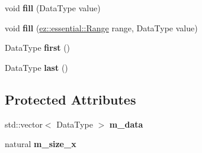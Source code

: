 \begin{DoxyCompactItemize}
\item 
\mbox{\label{classez_1_1maths_1_1Vector_af15ef4c65e880324592dd48622c3e664}} 
void {\bfseries fill} (Data\+Type value)
\item 
\mbox{\label{classez_1_1maths_1_1Vector_a3140d8b5e6aec1ac16b8607bc277551f}} 
void {\bfseries fill} (\hyperlink{classez_1_1essential_1_1Range}{ez\+::essential\+::\+Range} range, Data\+Type value)
\item 
\mbox{\label{classez_1_1maths_1_1Vector_a6cdee22c3c62e40d9eac8b44f47a6e30}} 
Data\+Type {\bfseries first} ()
\item 
\mbox{\label{classez_1_1maths_1_1Vector_a816b2cfa16bbcf8d54dd43ebd24b59b6}} 
Data\+Type {\bfseries last} ()
\end{DoxyCompactItemize}
\subsection*{Protected Attributes}
\begin{DoxyCompactItemize}
\item 
\mbox{\label{classez_1_1maths_1_1Vector_a267b04ede91373b05d814f2f610e998d}} 
std\+::vector$<$ Data\+Type $>$ {\bfseries m\+\_\+data}
\item 
\mbox{\label{classez_1_1maths_1_1Vector_a98f1b2a1e607d7b6ca44ed9c619bbe0b}} 
natural {\bfseries m\+\_\+size\+\_\+x}
\end{DoxyCompactItemize}
